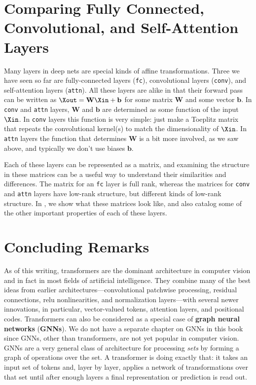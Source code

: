 \section{Comparing Fully Connected, Convolutional, and Self-Attention Layers}
Many layers in deep nets are special kinds of affine transformations. Three we have seen so far are fully-connected layers (\texttt{fc}), convolutional layers (\texttt{conv}), and self-attention layers (\texttt{attn}). All these layers are alike in that their forward pass can be written as $\Xout = \mathbf{W}\Xin + \mathbf{b}$ for some matrix $\mathbf{W}$ and some vector $\mathbf{b}$. In \texttt{conv} and \texttt{attn} layers, $\mathbf{W}$ and $\mathbf{b}$ are determined as some function of the input $\Xin$. In \texttt{conv} layers this function is very simple: just make a Toeplitz matrix that repeats the convolutional kernel(s) to match the dimensionality of $\Xin$. In \texttt{attn} layers the function that determines $\mathbf{W}$ is a bit more involved, as we saw above, and typically we don't use biases $\mathbf{b}$.

Each of these layers can be represented as a matrix, and examining the structure in these matrices can be a useful way to understand their similarities and differences. The matrix for an \texttt{fc} layer is full rank, whereas the matrices for \texttt{conv} and \texttt{attn} layers have low-rank structure, but different kinds of low-rank structure. In \fig{\ref{fig:transformers:affine_layer_comparison}}, we show what these matrices look like, and also catalog some of the other important properties of each of these layers.


\section{Concluding Remarks}
As of this writing, transformers are the dominant architecture in computer vision and in fact in most fields of artificial intelligence. They combine many of the best ideas from earlier architectures—convolutional patchwise processing, residual connections, relu nonlinearities, and normalization layers—with several newer innovations, in particular, vector-valued tokens, attention layers, and positional codes. Transformers can also be considered as a special case of \textbf{graph neural networks} (\textbf{GNNs}). We do not have a separate chapter on GNNs in this book since GNNs, other than transformers, are not yet popular in computer vision. GNNs are a very general class of architecture for processing \textit{sets} by forming a graph of operations over the set. A transformer is doing exactly that: it takes an input set of tokens and, layer by layer, applies a network of transformations over that set until after enough layers a final representation or prediction is read out.